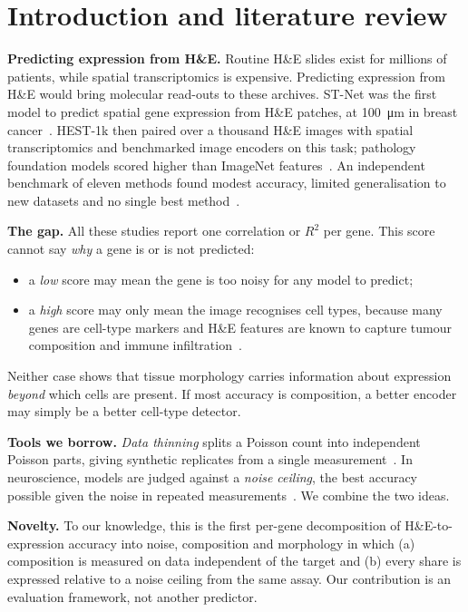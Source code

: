\documentclass[11pt,a4paper]{article}
\begin{document}
\section{Introduction and literature review}
\label{sec:intro}

\textbf{Predicting expression from H\&E.} Routine H\&E slides exist for millions of patients, while spatial transcriptomics is expensive. Predicting expression from H\&E would bring molecular read-outs to these archives. ST-Net was the first model to predict spatial gene expression from H\&E patches, at \SI{100}{\micro\metre} in breast cancer~\cite{he2020stnet}. HEST-1k then paired over a thousand H\&E images with spatial transcriptomics and benchmarked image encoders on this task; pathology foundation models scored higher than ImageNet features~\cite{jaume2024hest}. An independent benchmark of eleven methods found modest accuracy, limited generalisation to new datasets and no single best method~\cite{wang2025benchmark}.

\textbf{The gap.} All these studies report one correlation or $R^2$ per gene. This score cannot say \emph{why} a gene is or is not predicted:
\begin{itemize}
  \item a \emph{low} score may mean the gene is too noisy for any model to predict;
  \item a \emph{high} score may only mean the image recognises cell types, because many genes are cell-type markers and H\&E features are known to capture tumour composition and immune infiltration~\cite{fu2020pancancer}.
\end{itemize}
Neither case shows that tissue morphology carries information about expression \emph{beyond} which cells are present. If most accuracy is composition, a better encoder may simply be a better cell-type detector.

\textbf{Tools we borrow.} \emph{Data thinning} splits a Poisson count into independent Poisson parts, giving synthetic replicates from a single measurement~\cite{neufeld2024thinning}. In neuroscience, models are judged against a \emph{noise ceiling}, the best accuracy possible given the noise in repeated measurements~\cite{lagecastellanos2019noise}. We combine the two ideas.

\textbf{Novelty.} To our knowledge, this is the first per-gene decomposition of H\&E-to-expression accuracy into noise, composition and morphology in which (a) composition is measured on data independent of the target and (b) every share is expressed relative to a noise ceiling from the same assay. Our contribution is an evaluation framework, not another predictor.
\end{document}
